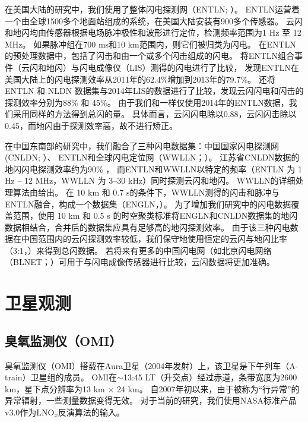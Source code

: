 在美国大陆的研究中，我们使用了整体闪电探测网（ENTLN; \citet{Marchand.2019}）。
ENTLN运营着一个由全球1500多个地面站组成的系统，在美国大陆安装有900多个传感器\citep{Zhu.2017}。
云闪和地闪均由传感器根据电场脉冲极性和波形进行定位，检测频率范围为1 Hz 至 12 MHz。
如果脉冲组在700 ms和10 km范围内，则它们被归类为闪电。
在ENTLN的预处理数据中，包括了闪击和由一个或多个闪击组成的闪电。
\citet{Rudlosky.2015}将ENTLN组合事件（云闪和地闪）与闪电成像仪（LIS）测得的闪电进行了比较，
发现ENTLN在美国大陆上的闪电探测效率从2011年的62.4\%增加到2013年的79.7\%。
\citet{Lapierre.2020}还将 ENTLN 和 NLDN 数据集与2014年LIS的数据进行了比较，发现云闪闪电和闪击的探测效率分别为88\% 和 45\%。
由于我们和\citet{Lapierre.2020}一样仅使用2014年的ENTLN数据，我们采用同样的方法得到总闪的量。
具体而言，云闪闪电除以0.88，云闪闪击除以0.45，而地闪由于探测效率高，故不进行矫正。

在中国东南部的研究中，我们融合了三种闪电数据集：中国国家闪电探测网(CNLDN; \citet{Yang.2015}）、
ENTLN和全球闪电定位网（WWLLN；\citet{Rodger.2006}）。
江苏省CNLDN数据的地闪闪电探测效率约为90\% \citep{Li.2017a}，
而ENTLN和WWLLN以特定的频率（ENTLN 为 1 Hz -- 12 MHz，WWLLN 为 3--30 kHz）同时探测云闪和地闪。
WWLLN的详细处理算法由\citet{Rodger.2004}给出。
在 10 km 和 0.7 s的条件下，WWLLN测得的闪击和脉冲与ENTLN融合，构成一个数据集（ENGLN，\citet{Virts.2020b}）。
为了增加我们研究中的闪电数据覆盖范围，使用 10 km 和 0.5 s 的时空聚类标准将ENGLN和CNLDN数据集的地闪数据相结合\citep{Zhao.2020}，合并后的数据集应具有足够高的地闪探测效率。
由于该三种闪电数据在中国范围内的云闪探测效率较低，我们保守地使用恒定的云闪与地闪比率（3:1，\citet{Wu.2016,Bandholnopparat.2020}）来得到总闪数据。
若将来有更多的中国闪电网（如北京闪电网络（BLNET；\citet{Srivastava.2017}）可用于与闪电成像传感器进行比较\citep{Rudlosky.2013,Poelman.2020}，云闪数据将更加准确。

\section{卫星观测}

\subsection{臭氧监测仪（OMI）}

臭氧监测仪（OMI）搭载在Aura卫星（2004年发射）上，该卫星是下午列车（A-train）卫星组的成员\citep{Levelt.2006,Levelt.2018}。
OMI在$\sim$13:45 LT（升交点）经过赤道，条带宽度为2600 km，星下点分辨率为13 km $\times$ 24 km。
自2007年初以来，由于被称为“行异常”的异常辐射\citep{Dobber.2008}，一些测量数据变得无效。
对于当前的研究，我们使用NASA标准产品v3.0\citep{Krotkov.2017}作为LNO$_x$反演算法的输入。

